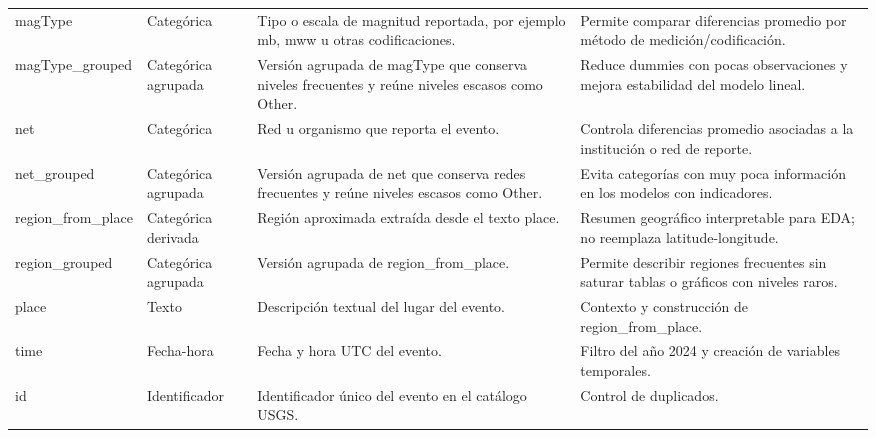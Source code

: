 \begin{tabular}{llll}
magType & Categórica & Tipo o escala de magnitud reportada, por ejemplo mb, mww u otras codificaciones. & Permite comparar diferencias promedio por método de medición/codificación. \\
magType\_grouped & Categórica agrupada & Versión agrupada de magType que conserva niveles frecuentes y reúne niveles escasos como Other. & Reduce dummies con pocas observaciones y mejora estabilidad del modelo lineal. \\
net & Categórica & Red u organismo que reporta el evento. & Controla diferencias promedio asociadas a la institución o red de reporte. \\
net\_grouped & Categórica agrupada & Versión agrupada de net que conserva redes frecuentes y reúne niveles escasos como Other. & Evita categorías con muy poca información en los modelos con indicadores. \\
region\_from\_place & Categórica derivada & Región aproximada extraída desde el texto place. & Resumen geográfico interpretable para EDA; no reemplaza latitude-longitude. \\
region\_grouped & Categórica agrupada & Versión agrupada de region\_from\_place. & Permite describir regiones frecuentes sin saturar tablas o gráficos con niveles raros. \\
place & Texto & Descripción textual del lugar del evento. & Contexto y construcción de region\_from\_place. \\
time & Fecha-hora & Fecha y hora UTC del evento. & Filtro del año 2024 y creación de variables temporales. \\
id & Identificador & Identificador único del evento en el catálogo USGS. & Control de duplicados. \\
\bottomrule
\end{tabular}
